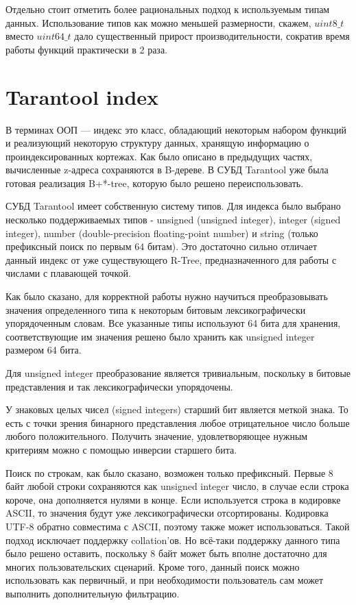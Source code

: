 Отдельно стоит отметить более рациональных подход к используемым типам данных.
Использование типов как можно меньшей размерности, скажем,
$uint8\_t$ вместо $uint64\_t$ дало существенный прирост производительности, сократив время работы функций практически в 2 раза.

\section{Tarantool index}
В терминах ООП --- индекс это класс, обладающий некоторым набором функций и реализующий некоторую структуру данных, хранящую информацию о проиндексированных кортежах.
Как было описано в предыдущих частях, вычисленные z-адреса сохраняются в B-дереве. В СУБД Tarantool уже была готовая реализация B+*-tree, которую было решено переиспользовать.

СУБД Tarantool имеет собственную систему типов. Для индекса было выбрано несколько поддерживаемых типов - unsigned (unsigned integer), integer (signed integer), number (double-precision floating-point number) и string (только префиксный поиск по первым 64 битам). Это достаточно сильно отличает данный индекс от уже существующего R-Tree, предназначенного для работы с числами с плавающей точкой. 

Как было сказано, для корректной работы нужно научиться преобразовывать значения определенного типа к некоторым битовым лексикографически упорядоченным словам. Все указанные типы используют 64 бита для хранения, соответствующие им значения решено было хранить как unsigned integer размером 64 бита. 

Для unsigned integer преобразование является тривиальным, поскольку в битовые представления и так лексикографически упорядочены. 

У знаковых целых чисел (signed integers) старший бит является меткой знака. То есть с точки зрения бинарного представления любое отрицательное число больше любого положительного. Получить значение, удовлетворяющее нужным критериям можно с помощью инверсии старшего бита.

Поиск по строкам, как было сказано, возможен только префиксный. Первые 8 байт любой строки сохраняются как unsigned integer число, в случае если строка короче, она дополняется нулями в конце. Если используется строка в кодировке ASCII, то значения будут уже лексикографически отсортированы. Кодировка UTF-8 обратно совместима с ASCII, поэтому также может использоваться. Такой подход исключает поддержку collation’ов. Но всё-таки поддержку данного типа было решено оставить, поскольку 8 байт может быть вполне достаточно для многих пользовательских сценарий. Кроме того, данный поиск можно использовать как первичный, и при необходимости пользователь сам может выполнить дополнительную фильтрацию.

